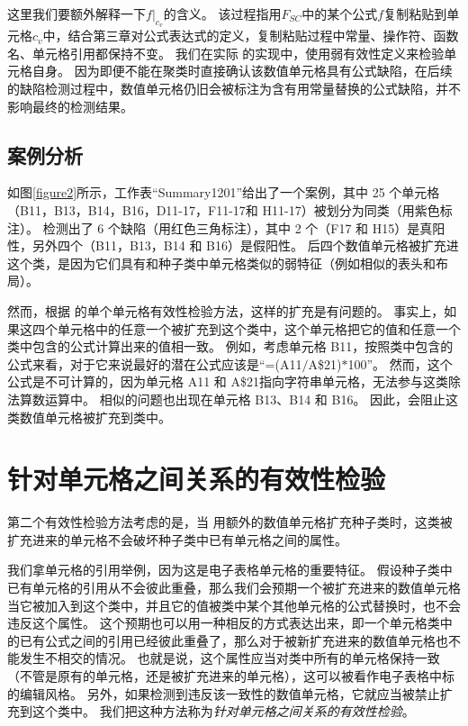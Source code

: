 这里我们要额外解释一下$f|_{c_v}$的含义。
该过程指用$F_{SC}$中的某个公式$f$复制粘贴到单元格$c_v$中，结合第三章对公式表达式的定义，复制粘贴过程中常量、操作符、函数名、单元格引用都保持不变。
我们在实际 \wa 的实现中，使用弱有效性定义来检验单元格自身。
因为即便不能在聚类时直接确认该数值单元格具有公式缺陷，在后续的缺陷检测过程中，数值单元格仍旧会被标注为含有用常量替换的公式缺陷，并不影响最终的检测结果。

\subsection*{案例分析}
如图\ref{figure2}所示，工作表“Summary1201”给出了一个案例，其中 25 个单元格（B11，B13，B14，B16，D11-17，F11-17和 H11-17）被\cu 划分为同类（用紫色标注）。
\cu 检测出了 6 个缺陷（用红色三角标注），其中 2 个（F17 和 H15）是真阳性，另外四个（B11，B13，B14 和 B16）是假阳性。
后四个数值单元格被扩充进这个类，是因为它们具有和种子类中单元格类似的弱特征（例如相似的表头和布局）。

然而，根据 \wa 的单个单元格有效性检验方法，这样的扩充是有问题的。
事实上，如果这四个单元格中的任意一个被扩充到这个类中，这个单元格把它的值和任意一个类中包含的公式计算出来的值相一致。
例如，考虑单元格 B11，按照类中包含的公式来看，对于它来说最好的潜在公式应该是“=(A11$/$A\$21)$*$100”。
然而，这个公式是不可计算的，因为单元格 A11 和 A\$21指向字符串单元格，无法参与这类除法算数运算中。
相似的问题也出现在单元格 B13、B14 和 B16。 
因此，\wa 会阻止这类数值单元格被扩充到类中。


\section{针对单元格之间关系的有效性检验}
第二个有效性检验方法考虑的是，当 \wa 用额外的数值单元格扩充种子类时，这类被扩充进来的单元格不会破坏种子类中已有单元格之间的属性。

我们拿单元格的引用举例，因为这是电子表格单元格的重要特征。
假设种子类中已有单元格的引用从不会彼此重叠，那么我们会预期一个被扩充进来的数值单元格当它被加入到这个类中，并且它的值被类中某个其他单元格的公式替换时，也不会违反这个属性。
这个预期也可以用一种相反的方式表达出来，即一个单元格类中的已有公式之间的引用已经彼此重叠了，那么对于被新扩充进来的数值单元格也不能发生不相交的情况。
也就是说，这个属性应当对类中所有的单元格保持一致（不管是原有的单元格，还是被扩充进来的单元格），这可以被看作电子表格中标的编辑风格。
另外，如果检测到违反该一致性的数值单元格，它就应当被禁止扩充到这个类中。
我们把这种方法称为\textit{针对单元格之间关系的有效性检验}。

